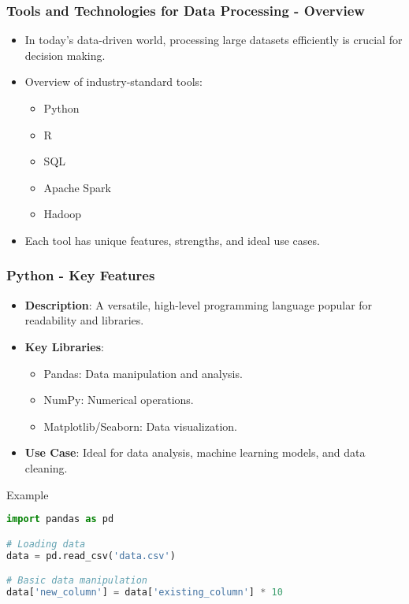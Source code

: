 \documentclass[aspectratio=169]{beamer}
\begin{document}
\begin{frame}[fragile]
    \frametitle{Tools and Technologies for Data Processing - Overview}
    \begin{itemize}
        \item In today's data-driven world, processing large datasets efficiently is crucial for decision making.
        \item Overview of industry-standard tools:
        \begin{itemize}
            \item Python
            \item R
            \item SQL
            \item Apache Spark
            \item Hadoop
        \end{itemize}
        \item Each tool has unique features, strengths, and ideal use cases.
    \end{itemize}
\end{frame}

\begin{frame}[fragile]
    \frametitle{Python - Key Features}
    \begin{itemize}
        \item \textbf{Description}: A versatile, high-level programming language popular for readability and libraries.
        \item \textbf{Key Libraries}:
        \begin{itemize}
            \item Pandas: Data manipulation and analysis.
            \item NumPy: Numerical operations.
            \item Matplotlib/Seaborn: Data visualization.
        \end{itemize}
        \item \textbf{Use Case}: Ideal for data analysis, machine learning models, and data cleaning.
    \end{itemize}
    \begin{block}{Example}
        \begin{lstlisting}[language=Python]
import pandas as pd

# Loading data
data = pd.read_csv('data.csv')

# Basic data manipulation
data['new_column'] = data['existing_column'] * 10
        \end{lstlisting}
    \end{block}
\end{frame}
\end{document}
